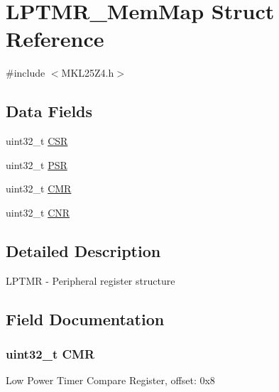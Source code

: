 \hypertarget{struct_l_p_t_m_r___mem_map}{}\section{L\+P\+T\+M\+R\+\_\+\+Mem\+Map Struct Reference}
\label{struct_l_p_t_m_r___mem_map}


{\ttfamily \#include $<$M\+K\+L25\+Z4.\+h$>$}

\subsection*{Data Fields}
\begin{DoxyCompactItemize}
\item 
uint32\+\_\+t \hyperlink{struct_l_p_t_m_r___mem_map_a9f762945117456968eec12c384b1b4e1}{C\+S\+R}
\item 
uint32\+\_\+t \hyperlink{struct_l_p_t_m_r___mem_map_a72127a2e703db8406742669d5cbd7f90}{P\+S\+R}
\item 
uint32\+\_\+t \hyperlink{struct_l_p_t_m_r___mem_map_aed876cad34a09b6c41e897664f2a1031}{C\+M\+R}
\item 
uint32\+\_\+t \hyperlink{struct_l_p_t_m_r___mem_map_a2077b5eef950a2fc28defcc74f06a6c0}{C\+N\+R}
\end{DoxyCompactItemize}


\subsection{Detailed Description}
L\+P\+T\+M\+R -\/ Peripheral register structure 

\subsection{Field Documentation}
\hypertarget{struct_l_p_t_m_r___mem_map_aed876cad34a09b6c41e897664f2a1031}{}
\subsubsection[{C\+M\+R}]{\setlength{\rightskip}{0pt plus 5cm}uint32\+\_\+t C\+M\+R}\label{struct_l_p_t_m_r___mem_map_aed876cad34a09b6c41e897664f2a1031}
Low Power Timer Compare Register, offset\+: 0x8 \hypertarget{struct_l_p_t_m_r___mem_map_a2077b5eef950a2fc28defcc74f06a6c0}{}
